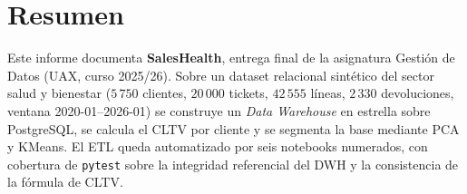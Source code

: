 \documentclass[11pt, a4paper, oneside]{article}
\begin{document}
\makecoverpage

\section*{Resumen}

Este informe documenta \textbf{SalesHealth}, entrega final de la asignatura
Gestión de Datos (UAX, curso 2025/26). Sobre un dataset relacional sintético
del sector salud y bienestar ($5\,750$ clientes, $20\,000$ tickets, $42\,555$
líneas, $2\,330$ devoluciones, ventana 2020-01--2026-01) se construye un
\emph{Data Warehouse} en estrella sobre PostgreSQL, se calcula el CLTV por
cliente y se segmenta la base mediante PCA y KMeans. El ETL queda
automatizado por seis notebooks numerados, con cobertura de \texttt{pytest}
sobre la integridad referencial del DWH y la consistencia de la fórmula
de CLTV.







\end{document}

